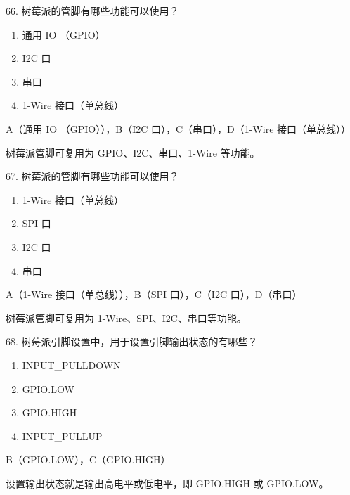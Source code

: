 \begin{question}{66. 树莓派的管脚有哪些功能可以使用？}
\begin{enumerate}[label=\Alph*., leftmargin=2.4em, itemsep=0.2em]
\item 通用 IO （GPIO）
\item I2C 口
\item 串口
\item 1-Wire 接口（单总线）
\end{enumerate}
\end{question}
\begin{answer}
A（通用 IO （GPIO）），B（I2C 口），C（串口），D（1-Wire 接口（单总线））
\end{answer}
\begin{explanation}
树莓派管脚可复用为 GPIO、I2C、串口、1-Wire 等功能。
\end{explanation}

\begin{question}{67. 树莓派的管脚有哪些功能可以使用？}
\begin{enumerate}[label=\Alph*., leftmargin=2.4em, itemsep=0.2em]
\item 1-Wire 接口（单总线）
\item SPI 口
\item I2C 口
\item 串口
\end{enumerate}
\end{question}
\begin{answer}
A（1-Wire 接口（单总线）），B（SPI 口），C（I2C 口），D（串口）
\end{answer}
\begin{explanation}
树莓派管脚可复用为 1-Wire、SPI、I2C、串口等功能。
\end{explanation}

\begin{question}{68. 树莓派引脚设置中，用于设置引脚输出状态的有哪些？}
\begin{enumerate}[label=\Alph*., leftmargin=2.4em, itemsep=0.2em]
\item INPUT\_PULLDOWN
\item GPIO.LOW
\item GPIO.HIGH
\item INPUT\_PULLUP
\end{enumerate}
\end{question}
\begin{answer}
B（GPIO.LOW），C（GPIO.HIGH）
\end{answer}
\begin{explanation}
设置输出状态就是输出高电平或低电平，即 GPIO.HIGH 或 GPIO.LOW。
\end{explanation}

